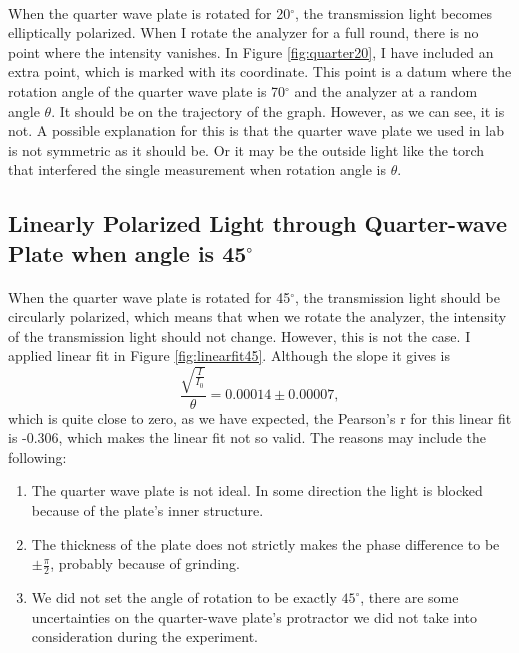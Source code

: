 \documentclass{my_template}
\begin{document}
    \paragraph{} When the quarter wave plate is rotated for 20$^\circ$, the transmission light becomes elliptically polarized. When I rotate the analyzer for a full round, there is no point where the intensity vanishes. In Figure \ref{fig:quarter20}, I have included an extra point, which is marked with its coordinate. This point is a datum where the rotation angle of the quarter wave plate is 70$^\circ$ and the analyzer at a random angle $\theta$. It should be on the trajectory of the graph. However, as we can see, it is not. A possible explanation for this is that the quarter wave plate we used in lab is not symmetric as it should be. Or it may be the outside light like the torch that interfered the single measurement when rotation angle is $\theta$. 
    \subsection{Linearly Polarized Light through Quarter-wave Plate when angle is 45$^\circ$}
    \paragraph{}When the quarter wave plate is rotated for 45$^\circ$, the transmission light should be circularly polarized, which means that when we rotate the analyzer, the intensity of the transmission light should not change. However, this is not the case. I applied linear fit in Figure \ref{fig:linearfit45}. Although the slope it gives is $$\frac{\sqrt{\frac{I}{I_0}}}{\theta}=0.00014\pm 0.00007,$$ which is quite close to zero, as we have expected, the Pearson's r for this linear fit is -0.306, which makes the linear fit not so valid. The reasons may include the following:
    \begin{enumerate}
        \item The quarter wave plate is not ideal. In some direction the light is blocked because of the plate's inner structure.
        \item The thickness of the plate does not strictly makes the phase difference to be $\pm\frac{\pi}{2}$, probably because of grinding.
        \item We did not set the angle of rotation to be exactly $45^\circ$, there are some uncertainties on the quarter-wave plate's protractor we did not take into consideration during the experiment.
    \end{enumerate}
\end{document}
